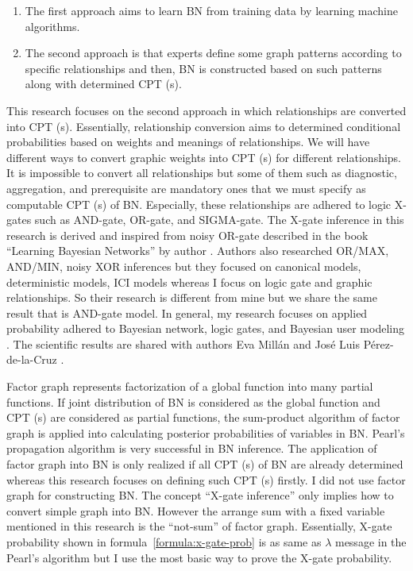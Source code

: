 \documentclass{article}
\numberwithin{equation}{section}
\numberwithin{figure}{section}
\numberwithin{table}{section}
\begin{document}
\begin{enumerate}
\item  The first approach aims to learn BN from training data by learning machine algorithms.

\item  The second approach is that experts define some graph patterns according to specific relationships and then, BN is constructed based on such patterns along with determined CPT (s).
\end{enumerate}

This research focuses on the second approach in which relationships are converted into CPT (s). Essentially, relationship conversion aims to determined conditional probabilities based on weights and meanings of relationships. We will have different ways to convert graphic weights into CPT (s) for different relationships. It is impossible to convert all relationships but some of them such as diagnostic, aggregation, and prerequisite are mandatory ones that we must specify as computable CPT (s) of BN. Especially, these relationships are adhered to logic X-gates \cite{wikipedia:logic-gates} such as AND-gate, OR-gate, and SIGMA-gate. The X-gate inference in this research is derived and inspired from noisy OR-gate described in the book ``Learning Bayesian Networks'' by author \cite[pp.~157-159]{neapolitan:bn}. Authors \cite{diez:pmodels} also researched OR/MAX, AND/MIN, noisy XOR inferences but they focused on canonical models, deterministic models, ICI models whereas I focus on logic gate and graphic relationships. So their research is different from mine but we share the same result that is AND-gate model. In general, my research focuses on applied probability adhered to Bayesian network, logic gates, and Bayesian user modeling \cite{millan:bayesiandiagnostic}. The scientific results are shared with authors Eva Millán and José Luis Pérez-de-la-Cruz \cite{millan:bayesiandiagnostic}.

Factor graph \cite{wikipedia:factor-graph} represents factorization of a global function into many partial functions. If joint distribution of BN is considered as the global function and CPT (s) are considered as partial functions, the sum-product algorithm \cite{kschischang:factor-graph} of factor graph is applied into calculating posterior probabilities of variables in BN. Pearl's propagation algorithm \cite{pearl:propagation} is very successful in BN inference. The application of factor graph into BN is only realized if all CPT (s) of BN are already determined whereas this research focuses on defining such CPT (s) firstly. I did not use factor graph for constructing BN. The concept ``X-gate inference'' only implies how to convert simple graph into BN. However the arrange sum with a fixed variable mentioned in this research is the ``not-sum'' \cite[p.~499]{kschischang:factor-graph} of factor graph. Essentially, X-gate probability shown in formula~\ref{formula:x-gate-prob} is as same as $\lambda$ message in the Pearl's algorithm \cite[p.~518]{kschischang:factor-graph} but I use the most basic way to prove the X-gate probability.
\end{document}
